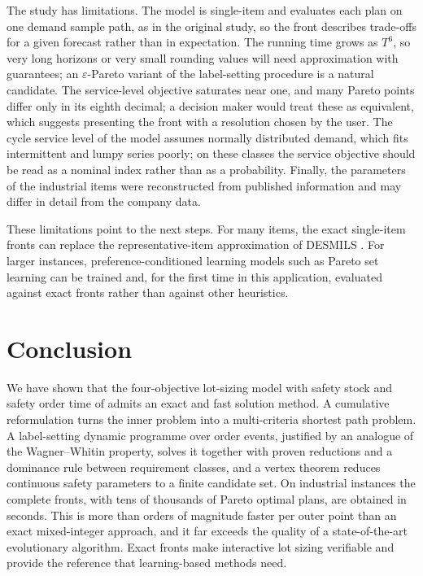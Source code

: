 \documentclass[preprint,12pt,authoryear]{elsarticle}
\begin{document}
The study has limitations. The model is single-item and evaluates each plan on one
demand sample path, as in the original study, so the front describes trade-offs for a
given forecast rather than in expectation. The running time grows as $T^6$, so very long
horizons or very small rounding values will need approximation with guarantees; an
$\varepsilon$-Pareto variant of the label-setting procedure is a natural candidate. The
service-level objective saturates near one, and many Pareto points differ only in its
eighth decimal; a decision maker would treat these as equivalent, which suggests
presenting the front with a resolution chosen by the user. The cycle service level of the model assumes normally distributed demand, which fits
intermittent and lumpy series poorly; on these classes the service objective should be
read as a nominal index rather than as a probability. Finally, the parameters of the
industrial items were reconstructed from published information and may differ in detail
from the company data.

These limitations point to the next steps. For many items, the exact single-item fronts
can replace the representative-item approximation of DESMILS
\citep{Kania2024DESMILS}. For larger instances, preference-conditioned learning models
such as Pareto set learning \citep{Lin2022PSL} can be trained and, for the first time
in this application, evaluated against exact fronts rather than against other
heuristics.

\section{Conclusion}\label{sec:conclusion}

We have shown that the four-objective lot-sizing model with safety stock and safety order
time of \citet{Kania2022CIE} admits an exact and fast solution method. A cumulative
reformulation turns the inner problem into a multi-criteria shortest path problem. A
label-setting dynamic programme over order events, justified by an analogue of the
Wagner--Whitin property, solves it together with proven reductions and a dominance rule
between requirement classes, and a vertex theorem reduces continuous safety parameters to a finite candidate set. On industrial
instances the complete fronts, with tens of thousands of Pareto optimal plans, are
obtained in seconds. This is more than \EfiveOrders{} orders of magnitude faster per outer point than an exact
mixed-integer approach, and it far exceeds the quality of a state-of-the-art
evolutionary algorithm. Exact fronts make interactive lot sizing verifiable and provide
the reference that learning-based methods need.
\end{document}
